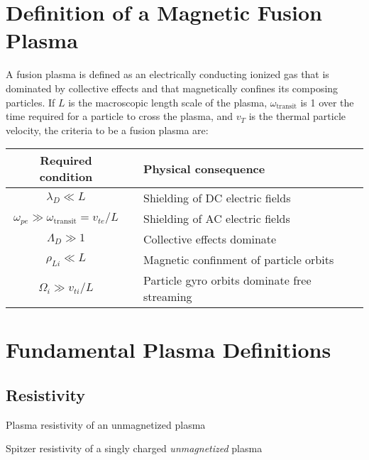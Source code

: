 \section{Definition of a Magnetic Fusion Plasma}
A fusion plasma is defined as an electrically conducting ionized gas
that is dominated by collective effects and that magnetically confines
its composing particles.  If $L$ is the macroscopic length scale of
the plasma, $\omega_\mathrm{transit}$ is 1 over the time required for
a particle to cross the plasma, and $v_T$ is the thermal particle
velocity, the criteria to be a fusion plasma are: 
\begin{table}[!h]
  \centering
  \begin{tabular}{c c l}
    \hline
    Required condition \T\B& & Physical consequence\\[4pt]
    \hline\hline
    $\lambda_D \ll L$ \T& & Shielding of DC electric fields\\[4pt]
    $\omega_{pe} \gg \omega_{\text{transit}} = v_{te}/L$ & & Shielding of AC electric fields\\[4pt]
    $\Lambda_D \gg 1$ & & Collective effects dominate\\[4pt]
    $\rho_{Li} \ll L$ & & Magnetic confinment of particle orbits\\[4pt]
    $\Omega_i \gg v_{ti}/L$ \B& & Particle gyro orbits dominate free streaming\\[4pt]
    \hline
  \end{tabular}
\end{table}
    
\section{Fundamental Plasma Definitions}

\subsection{Resistivity}

\noindent
Plasma resistivity of an unmagnetized plasma 

\noindent
Spitzer resistivity of a singly charged \textit{unmagnetized} plasma 

